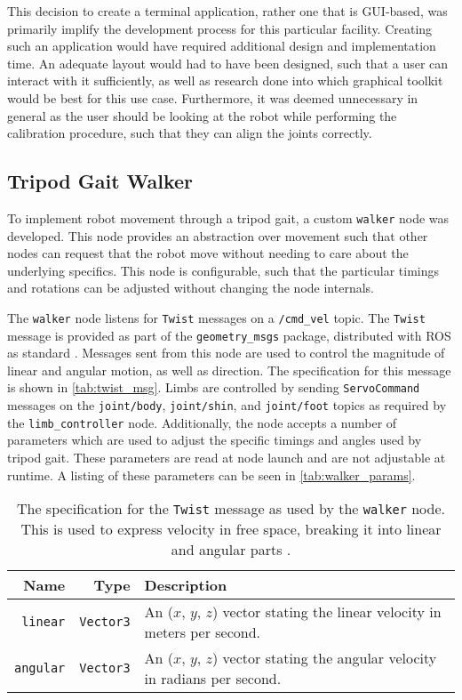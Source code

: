 This decision to create a terminal application, rather one that is GUI-based, was primarily  implify the development process for this particular facility. Creating such an application would have required additional design and implementation time. An adequate layout would had to have been designed, such that a user can interact with it sufficiently, as well as research done into which graphical toolkit would be best for this use case. Furthermore, it was deemed unnecessary in general as the user should be looking at the robot while performing the calibration procedure, such that they can align the joints correctly.

\subsection{Tripod Gait Walker}

To implement robot movement through a tripod gait, a custom \texttt{walker} node was developed. This node provides an abstraction over movement such that other nodes can request that the robot move without needing to care about the underlying specifics. This node is configurable, such that the particular timings and rotations can be adjusted without changing the node internals.

The \texttt{walker} node listens for \texttt{Twist} messages on a \texttt{/cmd\_vel} topic. The \texttt{Twist} message is provided as part of the \texttt{geometry\_msgs} package, distributed with ROS as standard \cite{ros_api_twist_msg}. Messages sent from this node are used to control the magnitude of linear and angular motion, as well as direction. The specification for this message is shown in \autoref{tab:twist_msg}. Limbs are controlled by sending \texttt{ServoCommand} messages on the \texttt{joint/body}, \texttt{joint/shin}, and \texttt{joint/foot} topics as required by the \texttt{limb\_controller} node. Additionally, the node accepts a number of parameters which are used to adjust the specific timings and angles used by tripod gait. These parameters are read at node launch and are not adjustable at runtime. A listing of these parameters can be seen in \autoref{tab:walker_params}.

\begin{table}[h!]
	\centering
	\begin{tabular}{ r r p{10cm} }
		\toprule
		\textbf{Name} & 
		\textbf{Type} & 
		\textbf{Description} \\
		\midrule

		\texttt{linear} & 
		\texttt{Vector3} &
		An ($x$, $y$, $z$) vector stating the linear velocity in meters per second. \\
		
		\hline

		\texttt{angular} & 
		\texttt{Vector3} & 
		An ($x$, $y$, $z$) vector stating the angular velocity in radians per second. \\
		\bottomrule
	\end{tabular}
	\caption{The specification for the \texttt{Twist} message as used by the \texttt{walker} node. This is used to express velocity in free space, breaking it into linear and angular parts \cite{ros_api_twist_msg}.}
	\label{tab:twist_msg}
\end{table}

